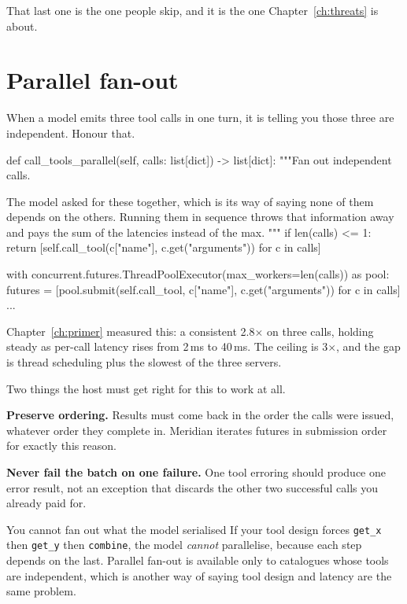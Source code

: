 That last one is the one people skip, and it is the one Chapter~\ref{ch:threats}
is about.

\section{Parallel fan-out}

When a model emits three tool calls in one turn, it is telling you those three
are independent. Honour that.

\begin{py}
def call_tools_parallel(self, calls: list[dict]) -> list[dict]:
    """Fan out independent calls.

    The model asked for these together, which is its way of saying none of
    them depends on the others. Running them in sequence throws that
    information away and pays the sum of the latencies instead of the max.
    """
    if len(calls) <= 1:
        return [self.call_tool(c["name"], c.get("arguments")) for c in calls]

    with concurrent.futures.ThreadPoolExecutor(max_workers=len(calls)) as pool:
        futures = [pool.submit(self.call_tool, c["name"], c.get("arguments"))
                   for c in calls]
        ...
\end{py}

Chapter~\ref{ch:primer} measured this: a consistent 2.8$\times$ on three calls,
holding steady as per-call latency rises from 2\,ms to 40\,ms. The ceiling is
3$\times$, and the gap is thread scheduling plus the slowest of the three
servers.

Two things the host must get right for this to work at all.

\textbf{Preserve ordering.} Results must come back in the order the calls were
issued, whatever order they complete in. Meridian iterates futures in submission order for exactly this reason.

\textbf{Never fail the batch on one failure.} One tool erroring should produce
one error result, not an exception that discards the other two successful calls
you already paid for.

\begin{notebox}{You cannot fan out what the model serialised}
If your tool design forces \texttt{get\_x} then \texttt{get\_y} then
\texttt{combine}, the model \emph{cannot} parallelise, because each step depends
on the last. Parallel fan-out is available only to catalogues whose tools are
independent, which is another way of saying tool design and latency are the same
problem.
\end{notebox}

